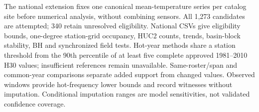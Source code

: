 The national extension fixes one canonical mean-temperature series per catalog site before numerical analysis, without combining sensors. All 1,273 candidates are attempted; 340 retain unresolved eligibility. National CSVs give eligibility bounds, one-degree station-grid occupancy, HUC2 counts, trends, basin-block stability, BH and synchronized field tests. Hot-year methods share a station threshold from the 90th percentile of at least five complete approved 1981--2010 H30 values; insufficient references remain unavailable. Same-roster/span and common-year comparisons separate added support from changed values. Observed windows provide hot-frequency lower bounds and record witnesses without imputation. Conditional imputation ranges are model sensitivities, not validated confidence coverage.
